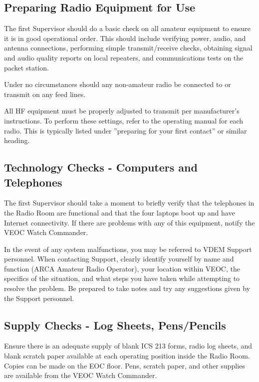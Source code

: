\documentclass[pdflatex,letterpaper,twoside,12pt]{book}
\begin{document}
\subsection{Preparing Radio Equipment for Use}

The first Supervisor should do a basic check on all amateur equipment to ensure it is in good operational order.  This should include verifying power, audio, and antenna connections, performing simple transmit/receive checks, obtaining signal and audio quality reports on local repeaters, and communications tests on the packet station.

Under no circumstances should any non-amateur radio be connected to or transmit on any feed lines.

All HF equipment must be properly adjusted to transmit per manufacturer's instructions.  To perform these settings, refer to the operating manual for each radio.  This is typically listed under ''preparing for your first contact'' or similar heading.

\subsection{Technology Checks - Computers and Telephones}

The first Supervisor should take a moment to briefly verify that the telephones in the Radio Room are functional and that the four laptops boot up and have Internet connectivity.  If there are problems with any of this equipment, notify the VEOC Watch Commander.

In the event of any system malfunctions, you may be referred to VDEM Support personnel.  When contacting Support, clearly identify yourself by name and function (ARCA Amateur Radio Operator), your location within VEOC, the specifics of the situation, and what steps you have taken while attempting to resolve the problem.  Be prepared to take notes and try any suggestions given by the Support personnel.

\subsection{Supply Checks - Log Sheets, Pens/Pencils}

Ensure there is an adequate supply of blank ICS 213 forms, radio log sheets, and blank scratch paper available at each operating position inside the Radio Room.  Copies can be made on the EOC floor.  Pens, scratch paper, and other supplies are available from the VEOC Watch Commander.
\end{document}
